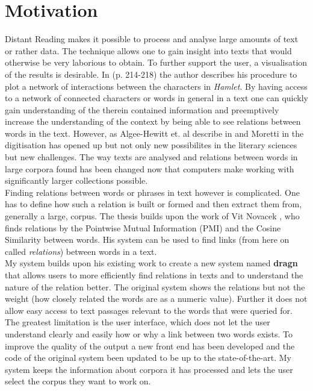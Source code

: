 \section{Motivation}
Distant Reading makes it possible to process and analyse large amounts of text or rather data. The technique allows one to gain insight into texts that would otherwise be very laborious to obtain. To further support the user, a visualisation of the results is desirable. In \cite{moretti13} (p. 214-218) the author describes his procedure to plot a network of interactions between the characters in \textit{Hamlet}.
By having access to a network of connected characters or words in general in a text one can quickly gain understanding of the therein contained information and preemptively increase the understanding of the context by being able to see relations between words in the text. However, as Algee-Hewitt et. al describe in \cite{algee2016canon} and Moretti in \cite{moretti2017patterns} the digitisation has opened up but not only new possibilites in the literary sciences but new challenges. The way texts are analysed and relations between words in large corpora found has been changed now that computers make working with significantly larger collections possible.\\
Finding relations between words or phrases in text however is complicated. One has to define how such a relation is built or formed and then extract them from, generally a large, corpus. The thesis builds upon the  work of Vit Novacek \cite{novavcek2014skimmr}, who finds relations by the Pointwise Mutual Information (PMI) and the Cosine Similarity between words. His system can be used to find links (from here on called \textit{relations}) between words in a text.\\
My system builds upon his existing work to create a new system named \textbf{dragn} that allows users to more efficiently find relations in texts and to understand the nature of the relation better. The original system shows the relations but not the weight (how closely related the words are as a numeric value). Further it does not allow easy access to text passages relevant to the words that were queried for. The greatest limitation is the user interface, which does not let the user understand clearly and easily how or why a link between two words exists. To improve the quality of the output a new front end has been developed and the code of the original system been updated to be up to the state-of-the-art. My system keeps the information about corpora it has processed and lets the user select the corpus they want to work on.\\
